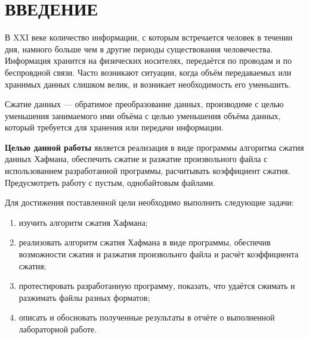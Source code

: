\chapter*{ВВЕДЕНИЕ}

В XXI веке количество информации, с которым встречается человек в течении дня, намного больше чем в другие периоды существования человечества. Информация хранится на физических носителях, передаётся по проводам и по беспровдной связи. Часто возникают ситуации, когда объём передаваемых или хранимых данных слишком велик, и возникает необходимость его уменьшить.

Сжатие данных --- обратимое преобразование данных, производиме с целью уменьшения занимаемого ими объёма с целью уменьшения объёма данных, который требуется для хранения или передачи информации.

\textbf{Целью данной работы} является реализация в виде программы алгоритма сжатия данных Хафмана, обеспечить сжатие и разжатие произвольного файла с использованием разработанной программы, расчитывать коэффициент сжатия. Предусмотреть работу с пустым, однобайтовым файлами.

Для достижения поставленной цели необходимо выполнить следующие задачи:
\begin{enumerate}[label=\arabic*)]
	\item изучить алгоритм сжатия Хафмана;
	\item реализовать алгоритм сжатия Хафмана в виде программы, обеспечив возможности сжатия и разжатия произвольнго файла и расчёт коэффициента сжатия;
	\item протестировать разработанную программу, показать, что удаётся сжимать и разжимать файлы разных форматов;
	\item описать и обосновать полученные результаты в отчёте о выполненной лабораторной работе.
\end{enumerate}
